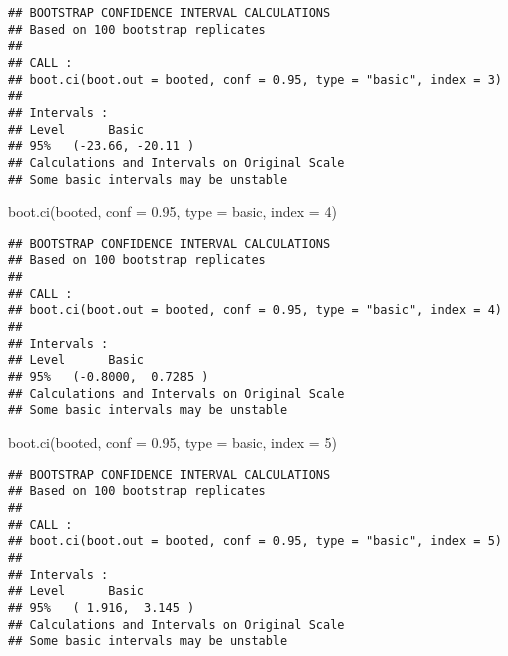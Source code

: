 \documentclass[
]{book}
\newenvironment{Shaded}{\begin{snugshade}}{\end{snugshade}}
\newcommand{\AttributeTok}[1]{\textcolor[rgb]{0.77,0.63,0.00}{#1}}
\newcommand{\DecValTok}[1]{\textcolor[rgb]{0.00,0.00,0.81}{#1}}
\newcommand{\FloatTok}[1]{\textcolor[rgb]{0.00,0.00,0.81}{#1}}
\newcommand{\FunctionTok}[1]{\textcolor[rgb]{0.00,0.00,0.00}{#1}}
\newcommand{\NormalTok}[1]{#1}
\newcommand{\StringTok}[1]{\textcolor[rgb]{0.31,0.60,0.02}{#1}}
\begin{document}
\begin{verbatim}
## BOOTSTRAP CONFIDENCE INTERVAL CALCULATIONS
## Based on 100 bootstrap replicates
## 
## CALL : 
## boot.ci(boot.out = booted, conf = 0.95, type = "basic", index = 3)
## 
## Intervals : 
## Level      Basic         
## 95%   (-23.66, -20.11 )  
## Calculations and Intervals on Original Scale
## Some basic intervals may be unstable
\end{verbatim}

\begin{Shaded}
\begin{Highlighting}[]
\FunctionTok{boot.ci}\NormalTok{(booted, }\AttributeTok{conf =} \FloatTok{0.95}\NormalTok{, }\AttributeTok{type =} \StringTok{\textquotesingle{}basic\textquotesingle{}}\NormalTok{, }\AttributeTok{index =} \DecValTok{4}\NormalTok{)}
\end{Highlighting}
\end{Shaded}

\begin{verbatim}
## BOOTSTRAP CONFIDENCE INTERVAL CALCULATIONS
## Based on 100 bootstrap replicates
## 
## CALL : 
## boot.ci(boot.out = booted, conf = 0.95, type = "basic", index = 4)
## 
## Intervals : 
## Level      Basic         
## 95%   (-0.8000,  0.7285 )  
## Calculations and Intervals on Original Scale
## Some basic intervals may be unstable
\end{verbatim}

\begin{Shaded}
\begin{Highlighting}[]
\FunctionTok{boot.ci}\NormalTok{(booted, }\AttributeTok{conf =} \FloatTok{0.95}\NormalTok{, }\AttributeTok{type =} \StringTok{\textquotesingle{}basic\textquotesingle{}}\NormalTok{, }\AttributeTok{index =} \DecValTok{5}\NormalTok{)}
\end{Highlighting}
\end{Shaded}

\begin{verbatim}
## BOOTSTRAP CONFIDENCE INTERVAL CALCULATIONS
## Based on 100 bootstrap replicates
## 
## CALL : 
## boot.ci(boot.out = booted, conf = 0.95, type = "basic", index = 5)
## 
## Intervals : 
## Level      Basic         
## 95%   ( 1.916,  3.145 )  
## Calculations and Intervals on Original Scale
## Some basic intervals may be unstable
\end{verbatim}

  
\end{document}
